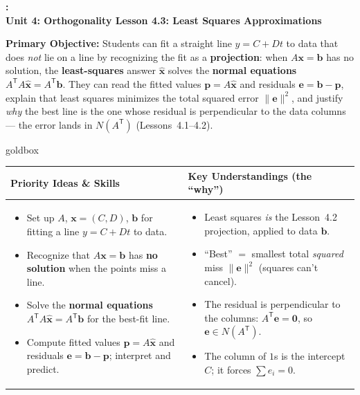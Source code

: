 \documentclass[10pt]{article}
\newcommand{\xx}{\mathbf{x}}
\newcommand{\bb}{\mathbf{b}}
\newcommand{\pp}{\mathbf{p}}
\newcommand{\ee}{\mathbf{e}}
\newcommand{\zero}{\mathbf{0}}
\newcommand{\T}{\mathsf{T}}
\newcommand{\UnitNumberName}{Unit 4: Orthogonality \quad}
\newcommand{\LessonNumberName}{Lesson 4.3: Least Squares Approximations}
\begin{document}
\begin{center}
    {\Large\bfseries \CourseName: \SchoolYear \\
    {\small\bfseries \UnitNumberName \LessonNumberName}}
\end{center}

\begin{tcolorbox}[colback=blush, colframe=burgundy, boxrule=0.9pt, arc=2mm,
    left=2mm, right=2mm, top=1.5mm, bottom=1.5mm]
    \textbf{Primary Objective:} Students can fit a straight line $y=C+Dt$ to data that does \emph{not}
    lie on a line by recognizing the fit as a \textbf{projection}: when $A\xx=\bb$ has no solution, the
    \textbf{least-squares} answer $\hat{\xx}$ solves the \textbf{normal equations} $A^{\T}A\hat{\xx}=A^{\T}\bb$.
    They can read the fitted values $\pp=A\hat{\xx}$ and residuals $\ee=\bb-\pp$, explain that least squares
    minimizes the total squared error $\|\ee\|^2$, and justify \emph{why} the best line is the one whose
    residual is perpendicular to the data columns --- the error lands in $N(A^{\T})$ (Lessons~4.1--4.2).
\end{tcolorbox}

\renewcommand{\arraystretch}{1.4}
\begin{skillbox}{goldbox}
\begin{tabularx}{\linewidth}{@{}X|X@{}}
\textbf{Priority Ideas \& Skills} & \textbf{Key Understandings (the ``why'')} \\[2pt]
\hline
\vspace{-6pt}
\begin{itemize}[leftmargin=1.1em, nosep, after=\vspace{2pt}]
  \item Set up $A$, $\xx=(C,D)$, $\bb$ for fitting a line $y=C+Dt$ to data.
  \item Recognize that $A\xx=\bb$ has \textbf{no solution} when the points miss a line.
  \item Solve the \textbf{normal equations} $A^{\T}A\hat{\xx}=A^{\T}\bb$ for the best-fit line.
  \item Compute fitted values $\pp=A\hat{\xx}$ and residuals $\ee=\bb-\pp$; interpret and predict.
\end{itemize}
&
\vspace{-6pt}
\begin{itemize}[leftmargin=1.1em, nosep, after=\vspace{2pt}]
  \item Least squares \emph{is} the Lesson~4.2 projection, applied to data $\bb$.
  \item ``Best'' $=$ smallest total \emph{squared} miss $\|\ee\|^2$ (squares can't cancel).
  \item The residual is perpendicular to the columns: $A^{\T}\ee=\zero$, so $\ee\in N(A^{\T})$.
  \item The column of $1$s is the intercept $C$; it forces $\sum e_i=0$.
\end{itemize}
\end{tabularx}
\end{skillbox}
\end{document}
